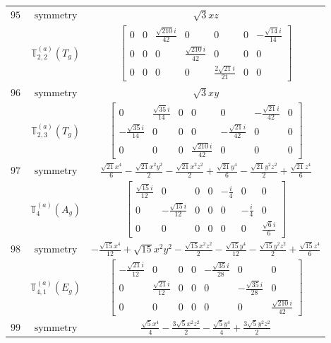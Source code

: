 \documentclass[fleqn,8pt,landscape]{jsarticle}
\begin{document}
\begin{longtable}{ccc}
$ 95 $ & $ \text{symmetry} $ & $ \sqrt{3} x z $ \\
$  $ & $ \mathbb{T}_{2,2}^{(a)}(T_{g}) $ & $ \begin{bmatrix} 0 & 0 & \frac{\sqrt{210} i}{42} & 0 & 0 & 0 & - \frac{\sqrt{14} i}{14} \\ 0 & 0 & 0 & \frac{\sqrt{210} i}{42} & 0 & 0 & 0 \\ 0 & 0 & 0 & 0 & \frac{2 \sqrt{21} i}{21} & 0 & 0 \end{bmatrix} $ \\ \hline
$ 96 $ & $ \text{symmetry} $ & $ \sqrt{3} x y $ \\
$  $ & $ \mathbb{T}_{2,3}^{(a)}(T_{g}) $ & $ \begin{bmatrix} 0 & \frac{\sqrt{35} i}{14} & 0 & 0 & 0 & - \frac{\sqrt{21} i}{42} & 0 \\ - \frac{\sqrt{35} i}{14} & 0 & 0 & 0 & - \frac{\sqrt{21} i}{42} & 0 & 0 \\ 0 & 0 & 0 & \frac{\sqrt{210} i}{42} & 0 & 0 & 0 \end{bmatrix} $ \\ \hline
$ 97 $ & $ \text{symmetry} $ & $ \frac{\sqrt{21} x^{4}}{6} - \frac{\sqrt{21} x^{2} y^{2}}{2} - \frac{\sqrt{21} x^{2} z^{2}}{2} + \frac{\sqrt{21} y^{4}}{6} - \frac{\sqrt{21} y^{2} z^{2}}{2} + \frac{\sqrt{21} z^{4}}{6} $ \\
$  $ & $ \mathbb{T}_{4}^{(a)}(A_{g}) $ & $ \begin{bmatrix} \frac{\sqrt{15} i}{12} & 0 & 0 & 0 & - \frac{i}{4} & 0 & 0 \\ 0 & - \frac{\sqrt{15} i}{12} & 0 & 0 & 0 & - \frac{i}{4} & 0 \\ 0 & 0 & 0 & 0 & 0 & 0 & \frac{\sqrt{6} i}{6} \end{bmatrix} $ \\ \hline
$ 98 $ & $ \text{symmetry} $ & $ - \frac{\sqrt{15} x^{4}}{12} + \sqrt{15} x^{2} y^{2} - \frac{\sqrt{15} x^{2} z^{2}}{2} - \frac{\sqrt{15} y^{4}}{12} - \frac{\sqrt{15} y^{2} z^{2}}{2} + \frac{\sqrt{15} z^{4}}{6} $ \\
$  $ & $ \mathbb{T}_{4,1}^{(a)}(E_{g}) $ & $ \begin{bmatrix} - \frac{\sqrt{21} i}{12} & 0 & 0 & 0 & - \frac{\sqrt{35} i}{28} & 0 & 0 \\ 0 & \frac{\sqrt{21} i}{12} & 0 & 0 & 0 & - \frac{\sqrt{35} i}{28} & 0 \\ 0 & 0 & 0 & 0 & 0 & 0 & \frac{\sqrt{210} i}{42} \end{bmatrix} $ \\ \hline
$ 99 $ & $ \text{symmetry} $ & $ \frac{\sqrt{5} x^{4}}{4} - \frac{3 \sqrt{5} x^{2} z^{2}}{2} - \frac{\sqrt{5} y^{4}}{4} + \frac{3 \sqrt{5} y^{2} z^{2}}{2} $ \\

\end{longtable}
\end{document}
